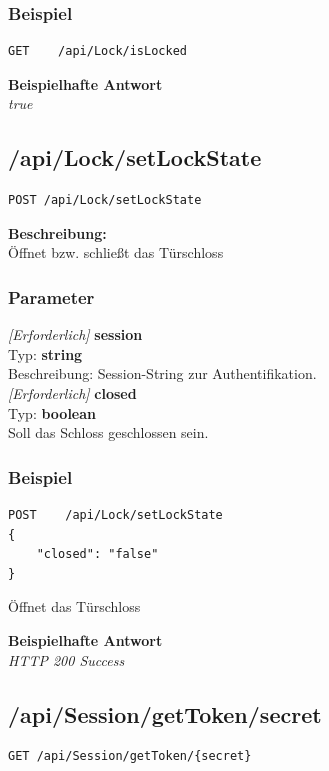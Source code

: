 \subsubsection{Beispiel}
\begin{lstlisting}
GET    /api/Lock/isLocked

\end{lstlisting}
\textbf{Beispielhafte Antwort} \\
\textit{true}





\subsection{/api/Lock/setLockState}
\begin{lstlisting}
POST /api/Lock/setLockState
\end{lstlisting}

\textbf{Beschreibung:} \\
Öffnet bzw. schließt das Türschloss 

\subsubsection{Parameter}
\textit{[Erforderlich]} \textbf{session} \\
Typ: \textbf{string} \\
Beschreibung: Session-String zur Authentifikation.\\

\textit{[Erforderlich]} \textbf{closed} \\
Typ: \textbf{boolean} \\
Soll das Schloss geschlossen sein.

\subsubsection{Beispiel}
\begin{lstlisting}
POST    /api/Lock/setLockState
{
    "closed": "false"
}
\end{lstlisting}
Öffnet das Türschloss

\textbf{Beispielhafte Antwort} \\
\textit{HTTP 200 Success}





\subsection{/api/Session/getToken/{secret}}
\begin{lstlisting}
GET /api/Session/getToken/{secret}
\end{lstlisting}

